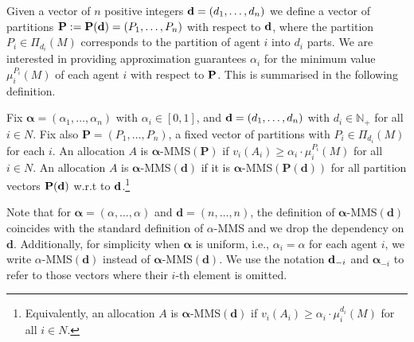  Given a vector of $n$ positive integers ${\bf d}=(d_1,\ldots, d_n)$ we define a vector of partitions ${\bf P:=P(d)}=(P_1,\ldots, P_n)$ with respect to ${\bf d}$,  where the
 partition $P_i\in \Pi_{d_i}(M)$ corresponds to the partition of agent
 $i$ into $d_i$ parts. We are interested in providing
 approximation guarantees $\alpha_i$ for the minimum value
 $\mu_i^{P_i}(M)$ of each agent $i$ with respect to ${\bf P}$. This is summarised in the following definition.
\begin{definition} \label{def:alpha-mms}
Fix $\boldsymbol{\alpha}=(\alpha_1,\ldots,\alpha_n)$ with $\alpha_i \in [0, 1]$, and ${\bf d}=(d_1,\ldots, d_n)$ with $d_i\in \mathbb{N}_+$ for all $i\in N$. Fix also $\mathbf{P}=(P_1,\ldots, P_n)$, a fixed vector of partitions with $P_i\in \Pi_{d_i}(M)$ for each $i$. An allocation $A$ is $\boldsymbol{\alpha}$-MMS$(\mathbf{P})$ if $v_i(A_i) \ge \alpha_i \cdot \mu_i^{P_i}(M)$ for all $i \in N$.    
An allocation $A$ is  $\boldsymbol{\alpha}$-MMS$(\mathbf{d})$ if it is $\boldsymbol{\alpha}$-MMS$(\mathbf{P(d)})$ for all partition vectors ${\bf P(d)}$ w.r.t to $\bf{d}$.\footnote{Equivalently, an allocation $A$ is  $\boldsymbol{\alpha}$-MMS$(\mathbf{d})$ if $v_i(A_i) \ge \alpha_i \cdot \mu_i^{d_i}(M)$ for all $i \in N$.}
\end{definition}

Note that for $\boldsymbol{\alpha}=(\alpha, \ldots,\alpha)$ and $\mathbf{d}=(n, \dots, n)$, the definition of $\boldsymbol{\alpha}$-MMS$(\mathbf{d})$ coincides with the standard definition of $\alpha$-MMS and we drop the dependency on $\mathbf{d}$. 
Additionally, for simplicity when $\boldsymbol{\alpha}$ is uniform, i.e., $\alpha_i=\alpha$ for each agent $i$, we write $\alpha$-MMS$(\mathbf{d})$ instead of $\boldsymbol{\alpha}$-MMS$(\mathbf{d})$. We use the notation ${\bf d}_{-i}$ and $\boldsymbol{\alpha}_{-i}$ to refer to those vectors where their $i$-th element is omitted.


